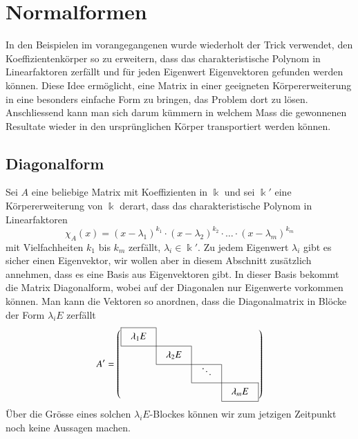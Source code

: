 %
%
%
\section{Normalformen
\label{buch:section:normalformen}}
In den Beispielen im vorangegangenen wurde wiederholt der Trick
verwendet, den Koeffizientenkörper so zu erweitern, dass das
charakteristische Polynom in Linearfaktoren zerfällt und 
für jeden Eigenwert Eigenvektoren gefunden werden können.
Diese Idee ermöglicht, eine Matrix in einer geeigneten Körpererweiterung
in eine besonders einfache Form zu bringen, das Problem dort zu lösen.
Anschliessend kann man sich darum kümmern in welchem Mass die gewonnenen
Resultate wieder in den ursprünglichen Körper transportiert werden können.

\subsection{Diagonalform}
Sei $A$ eine beliebige Matrix mit Koeffizienten in $\Bbbk$ und sei $\Bbbk'$
eine Körpererweiterung von $\Bbbk$ derart, dass das charakteristische
Polynom in Linearfaktoren
\[
\chi_A(x)
=
(x-\lambda_1)^{k_1}\cdot (x-\lambda_2)^{k_2}\cdot\dots\cdot (x-\lambda_m)^{k_m}
\]
mit Vielfachheiten $k_1$ bis $k_m$ zerfällt, $\lambda_i\in\Bbbk'$.
Zu jedem Eigenwert $\lambda_i$ gibt es sicher einen Eigenvektor, wir 
wollen aber in diesem Abschnitt zusätzlich annehmen, dass es eine Basis
aus Eigenvektoren gibt.
In dieser Basis bekommt die Matrix Diagonalform, wobei auf der 
Diagonalen nur Eigenwerte vorkommen können.
Man kann die Vektoren so anordnen, dass die Diagonalmatrix in Blöcke
der Form $\lambda_iE$ zerfällt
\[
\def\temp#1{\multicolumn{1}{|c}{\raisebox{0pt}[12pt][7pt]{\phantom{x}$#1$}\phantom{x}}}
A'
=\left(
\begin{array}{cccc}
\cline{1-1}
\temp{\lambda_1E} &\multicolumn{1}{|c}{}&        &           \\
\cline{1-2}
          &\temp{\lambda_2E}&\multicolumn{1}{|c}{}&           \\
\cline{2-3}
          &           &\temp{\ddots}&\multicolumn{1}{|c}{}\\
\cline{3-4}
          &           &        &\multicolumn{1}{|c|}{\raisebox{0pt}[12pt][7pt]{\phantom{x}$\lambda_mE$}\phantom{x}}\\
\cline{4-4}
\end{array}
\right)
\]
Über die Grösse eines solchen $\lambda_iE$-Blockes können wir zum jetzigen
Zeitpunkt noch keine Aussagen machen.

